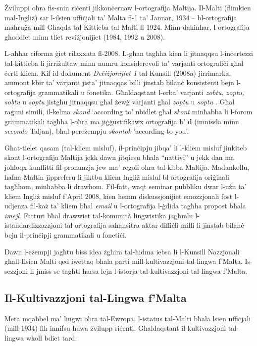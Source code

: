 \documentclass[]{../../metanetpaper}
\begin{document}
\begin{multicols}{2}
Żviluppi oħra fis-snin riċenti jikkonċernaw l-ortografija Maltija. Il-Malti (flimkien mal-Ingliż) sar l-ilsien uffiċjali ta’ Malta fl-1 ta’ Jannar, 1934 – bl-ortografija maħruġa mill-Għaqda tal-Kittieba tal-Malti fl-1924. Minn dakinhar, l-ortografija għaddiet minn tliet reviżjonijiet (1984, 1992 u 2008).

L-aħħar riforma ġiet rilaxxata fl-2008. L-għan tagħha kien li jitnaqqsu l-inċertezzi tal-kittieba li jirriżultaw minn numru konsiderevoli ta’ varjanti ortografiċi għal ċerti kliem. Kif id-dokument \emph{Deċiżjonijiet 1} tal-Kunsill (2008a) jirrimarka, ammont kbir ta’ varjanti jista' jitnaqqas billi jinstab bilanċ konsistenti bejn l-ortografija grammatikali u fonetika. Għaldaqstant l-erba’ varjanti \emph{zobtu, zoptu, sobtu} u \emph{soptu} jistgħu jitnaqqsu għal żewġ varjanti għal \emph{zoptu}  u \emph{soptu} . Għal raġuni simili, il-kelma \emph{skond}  `according to' nbidlet għal \emph{skont} minħabba li l-forom grammatikali tagħha l-oħra ma jiġġustifikawx ortografija b’ \textbf{d} (imnissla minn \emph{secondo} Taljan), bħal pereżempju \emph{skontok}  'according to you'.

Għat-tielet qasam (tal-kliem misluf), il-prinċipju jibqa’ li l-kliem misluf jinkiteb skont l-ortografija Maltija jekk dawn jitqiesu bħala ``nattivi'' u jekk dan ma joħloqx kunflitti fil-pronunzja jew ma’ regoli oħra tal-kitba Maltija. Madankollu, ħafna Maltin jippreferu li jiktbu kliem Ingliż misluf bl-ortografija oriġinali tagħhom, minħabba li drawhom. Fil-fatt, waqt seminar pubbliku dwar l-użu ta’ kliem Ingliż misluf f'April 2008, kien hemm diskussjonijiet emozzjonali fost l-udjenza fil-każ ta’ kliem bħal \emph{email} u l-ortografija l-ġdida tagħha propost bħala \emph{imejl}. Fatturi bħal drawwiet tal-komunità lingwistika jagħmlu l-istandardizzazzjoni tal-ortografija saħansitra aktar diffiċli milli li jinstab bilanċ bejn il-prinċipji grammatikali u fonetiċi.

Dawn l-eżempji jagħtu biss idea żgħira tal-ħidma iebsa li l-Kunsill Nazzjonali għall-Ilsien Malti qed iwettaq bħala parti mill-kultivazzjoni tal-lingwa f'Malta. Is-sezzjoni li jmiss se tagħti ħarsa lejn l-istorja tal-kultivazzjoni tal-lingwa f'Malta.

\subsection{Il-Kultivazzjoni tal-Lingwa f'Malta}

Meta mqabbel ma’ lingwi oħra tal-Ewropa, l-istatus tal-Malti bħala lsien uffiċjali (mill-1934) fih innifsu huwa żvilupp riċenti. Għaldaqstant il-kultivazzjoni tal-lingwa wkoll bdiet tard.


\end{multicols}
\end{document}
